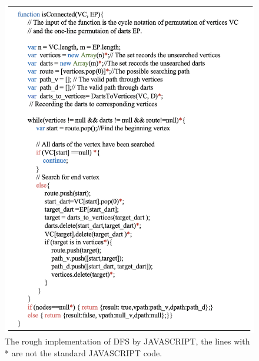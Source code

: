   \newpage
  \begin{figure}[htb]
    \centering
    \includegraphics[width=1\textwidth]{../../image/DFS.png}
    \caption{The rough implementation of DFS by JAVASCRIPT, the lines with \textcolor[RGB]{176,35,24}{*} are not the standard JAVASCRIPT code.}
    \label{fig:figures:DFS}
  \end{figure}

\newpage
